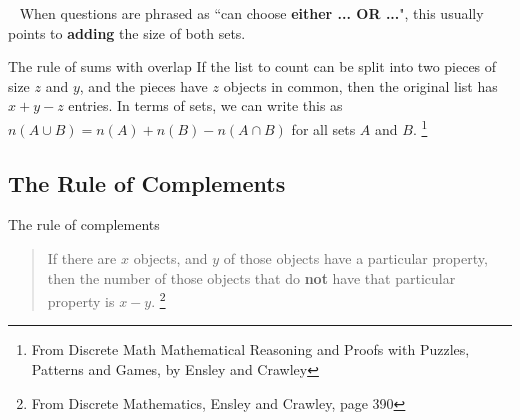         \begin{hint}{\ }
            When questions are phrased as ``can choose \textbf{either ... OR ...}",
            this usually points to \textbf{adding} the size of both sets.
        \end{hint}

    \newpage
    
    \begin{intro}{The rule of sums with overlap}
        If the list to count can be split into two pieces of size $z$
        and $y$, and the pieces have $z$ objects in common, then the original
        list has $x + y - z$ entries. In terms of sets, we can write this as
        $n(A \cup B) = n(A) + n(B) - n(A \cap B)$ for all sets $A$ and $B$.
    \footnote{From Discrete Math Mathematical Reasoning and Proofs with Puzzles, Patterns and Games, by Ensley and Crawley}
    \end{intro}

    \subsection{The Rule of Complements}
    
    \begin{intro}{The rule of complements}
        \begin{quote}
        If there are $x$ objects, and $y$ of those objects have a particular property,
        then the number of those objects that do \textbf{not} have that particular
        property is $x - y$.
        \footnote{From Discrete Mathematics, Ensley and Crawley, page 390}
        \end{quote}
    \end{intro}
    
